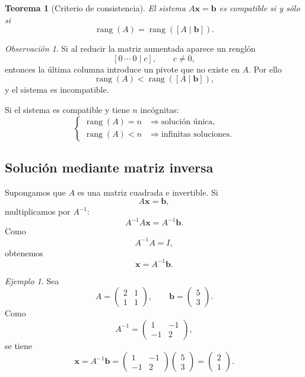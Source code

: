 \documentclass[12pt]{article}
\newtheorem{teorema}[definicion]{Teorema}
\theoremstyle{remark}
\newtheorem{observacion}[definicion]{Observación}
\newtheorem{ejemplo}[definicion]{Ejemplo}
\newcommand{\rank}{\operatorname{rang}}
\begin{document}
\begin{teorema}[Criterio de consistencia]
El sistema $A\mathbf{x}=\mathbf b$ es compatible si y sólo si
\[
\rank(A)=\rank([A\mid\mathbf b]).
\]
\end{teorema}

\begin{observacion}
Si al reducir la matriz aumentada aparece un renglón
\[
[0\ \cdots\ 0\mid c],\qquad c\neq0,
\]
entonces la última columna introduce un pivote que no existe en $A$. Por ello
\[
\rank(A)<\rank([A\mid\mathbf b]),
\]
y el sistema es incompatible.
\end{observacion}

Si el sistema es compatible y tiene $n$ incógnitas:
\[
\begin{cases}
\rank(A)=n &\Longrightarrow \text{solución única},\\
\rank(A)<n &\Longrightarrow \text{infinitas soluciones}.
\end{cases}
\]
\subsection*{Solución mediante matriz inversa}
Supongamos que $A$ es una matriz cuadrada e invertible. Si
\[
A\mathbf{x}=\mathbf b,
\]
multiplicamos por $A^{-1}$:
\[
A^{-1}A\mathbf{x}=A^{-1}\mathbf b.
\]
Como
\[
A^{-1}A=I,
\]
obtenemos
\[
\boxed{\mathbf{x}=A^{-1}\mathbf b.}
\]

\begin{ejemplo}
Sea
\[
A=
\begin{pmatrix}
2&1\\
1&1
\end{pmatrix},
\qquad
\mathbf b=
\begin{pmatrix}5\\3\end{pmatrix}.
\]
Como
\[
A^{-1}=
\begin{pmatrix}
1&-1\\
-1&2
\end{pmatrix},
\]
se tiene
\[
\mathbf x=A^{-1}\mathbf b
=
\begin{pmatrix}
1&-1\\
-1&2
\end{pmatrix}
\begin{pmatrix}5\\3\end{pmatrix}
=
\begin{pmatrix}2\\1\end{pmatrix}.
\]
\end{ejemplo}
\end{document}
